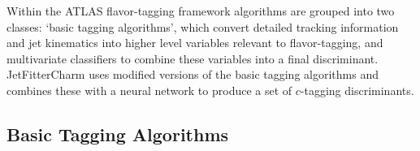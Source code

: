 Within the ATLAS flavor-tagging framework algorithms are grouped into two classes: `basic tagging algorithms', which convert detailed tracking information and jet kinematics into higher level variables relevant to flavor-tagging, and multivariate classifiers to combine these variables into a final discriminant.  JetFitterCharm uses modified versions of the basic tagging algorithms and combines these with a neural network to produce a set of $c$-tagging discriminants.


\subsection{Basic Tagging Algorithms}

\newcommand{\jfsignote}{The total significance of JetFitter vertices is computed as $S_{d}^{\rm JF} = (\sum_i L_{i} / \sigma^2_i )\big/(\sum_i 1 / \sigma^2_i)^{1/2}$,
where $i$ indexes the tracks, $L$ is the vertex displacement, and $\sigma$ is the vertex displacement uncertainty.}

